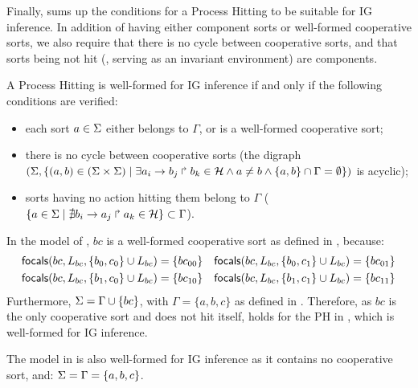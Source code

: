 Finally,  sums up the conditions for a Process Hitting to be suitable for IG
inference.
In addition of having either component sorts or well-formed cooperative sorts, we also require that
there is no cycle between cooperative sorts, and that
sorts being not hit (\ie{}, serving as an invariant environment) are components.

\begin{property}\label{pro:wf-ph}
A Process Hitting is well-formed for IG inference if and only if the following conditions are
verified:
\begin{itemize}
\item 
each sort $a\in\Sigma$ either belongs to $\Gamma$, or is a well-formed cooperative sort;
\item 
there is no cycle between cooperative sorts
(the digraph $(\Sigma,\{(a,b)\in(\Sigma\times\Sigma)\mid \exists a_i\rightarrow b_j\Rsh b_k\in\mathcal{H}
\wedge a\neq b\wedge \{a,b\}\cap\Gamma=\emptyset \})$ is
acyclic);
\item 
sorts having no action hitting them belong to $\Gamma$
($\{ a \in \Sigma\mid \nexists b_i\rightarrow a_j\Rsh a_k\in\mathcal{H}\} \subset \Gamma$).
\end{itemize}
\end{property}

\begin{example*}
In the model of , $bc$ is a well-formed cooperative sort as defined in , because:
\begin{align*}
\mathsf{focals}(bc, L_{bc}, \{b_0, c_0\} \cup L_{bc}) = \{bc_{00}\} && \mathsf{focals}(bc, L_{bc}, \{b_0, c_1\} \cup L_{bc}) = \{bc_{01}\} \\
\mathsf{focals}(bc, L_{bc}, \{b_1, c_0\} \cup L_{bc}) = \{bc_{10}\} && \mathsf{focals}(bc, L_{bc}, \{b_1, c_1\} \cup L_{bc}) = \{bc_{11}\}
\end{align*}
Furthermore, $\Sigma = \Gamma \cup \{bc\}$, with $\Gamma = \{a, b, c\}$ as defined in .
Therefore, as $bc$ is the only cooperative sort and does not hit itself,
 holds for the PH in , which is well-formed for IG inference.

The model in  is also well-formed for IG inference as it contains no cooperative sort, and: $\Sigma = \Gamma = \{a, b, c\}$.
\end{example*}


